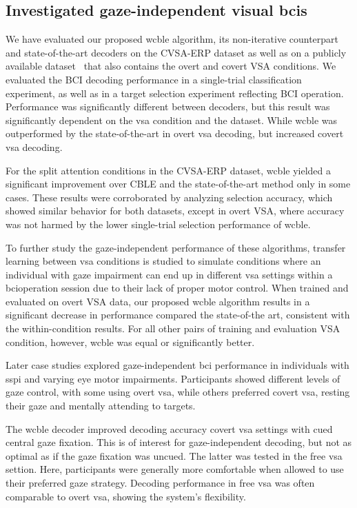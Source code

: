 \subsection{Investigated gaze-independent visual \acsp{bci}}

We have evaluated our proposed \ac{wcble} algorithm, its non-iterative
counterpart and state-of-the-art decoders on the CVSA-ERP dataset as well as on a publicly available
dataset~\cite{Aloise2012} that also contains the overt and covert VSA conditions.
We evaluated the BCI decoding performance in a single-trial classification experiment,
as well as in a target selection experiment reflecting BCI operation.
Performance was significantly different between decoders, but this
result was significantly dependent on the \ac{vsa} condition and the dataset.
While \ac{wcble} was outperformed by the state-of-the-art in overt \ac{vsa}
decoding, but increased covert \ac{vsa} decoding.

For the split attention conditions in the CVSA-ERP
dataset, \ac{wcble} yielded a significant improvement over CBLE and the
state-of-the-art method only in some cases.
These results were corroborated by analyzing selection accuracy, which showed
similar behavior for both datasets, except in overt
VSA, where accuracy was not harmed by the lower
single-trial selection performance of \ac{wcble}.

To further study the gaze-independent performance of these algorithms, transfer
learning between \ac{vsa} conditions is studied to simulate conditions where an
individual with gaze impairment can end up in different \ac{vsa} settings within
a \ac{bci}operation session due to their lack of proper motor control.
When trained and evaluated on overt VSA data, our proposed \ac{wcble} algorithm
results in a significant decrease in performance compared the state-of-the art,
consistent with the within-condition results.
For all other pairs of training and evaluation VSA condition, however,
\ac{wcble} was equal or significantly better.

Later case studies explored gaze-independent
\ac{bci} performance in individuals with \ac{sspi} and varying eye motor impairments.
Participants showed different levels of gaze control, with some using overt
\ac{vsa}, while others preferred covert \ac{vsa}, resting their gaze and
mentally attending to targets.

The \ac{wcble} decoder improved decoding accuracy covert
\ac{vsa} settings with cued central gaze fixation.
This is of interest for gaze-independent decoding, but not as optimal as if the
gaze fixation was uncued.
The latter was tested in the free \ac{vsa} settion.
Here, participants were generally more comfortable when allowed to use their
preferred gaze strategy.
Decoding performance in free \ac{vsa} was often comparable to overt \ac{vsa},
showing the system's flexibility.


